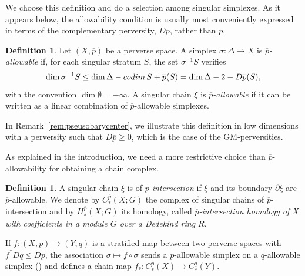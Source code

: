 \documentclass[a4paper,10pt,english,reqno]{amsart}
\theoremstyle{plain}
\theoremstyle{definition}
\newtheorem{definition}[proposition]{Definition}
\theoremstyle{remark}
\numberwithin{equation}{section}
\newcommand{\remref}[1]{Remark~\ref{#1}}
\def\ov{\overline}
\def\codim{{\rm codim\,}}
\renewcommand\1{\hbox{\ding{192}}}
\renewcommand\2{\hbox{\ding{193}}}
\newcommand\3{\hbox{\ding{194}}}
\newcommand\4{\hbox{\ding{195}}}
\begin{document}
%
We choose this  definition and do   a selection among singular simplexes. 
%
As it appears below, the allowability condition is usually most conveniently expressed in terms of the
complementary perversity, $D\ov{p}$, rather than $\ov{p}$.
%

\begin{definition}\label{def:homotopygeom}
Let $(X,\ov{p})$  be a  perverse space.
A simplex $\sigma\colon \Delta\to X$ is  
\emph{$\ov{p}$-allowable}  
if, for each singular stratum $S$, the set $\sigma^{-1}S$ verifies
%
\begin{equation}\label{equa:admissibleST}
\dim \sigma^{-1}S\leq \dim\Delta-\codim S +\ov{p}(S)=\dim\Delta-2-D\ov{p}(S),
\end{equation}
with the convention $\dim\emptyset=-\infty$.
A singular  chain $\xi$ is \emph{$\ov{p}$-allowable} if it can be written as a linear combination of 
$\ov{p}$-allowable  simplexes.
\end{definition}

%
 In \remref{rem:pseusobarycenter}, we illustrate this definition  in low dimensions with a  perversity such that 
 $D\ov{p}\geq 0$, which is the case of the GM-perversities.
%
%

\medskip
As explained in the introduction, we need a more restrictive choice than $\ov{p}$-allowability 
for obtaining a chain complex.
 
\begin{definition}\label{def:intersectionhomology}
A singular  chain $\xi$ is  of \emph{$\ov{p}$-intersection} if $\xi$ and its boundary $\partial \xi$ are $\ov{p}$-allowable.
We denote by $C_{*}^{\ov{p}}(X;G)$ the complex of singular chains of $\ov{p}$-intersection
and by $H_*^{\ov{p}}(X;G)$ its homology, called
\emph{$\ov{p}$-intersection homology of $X$ with coefficients in a module $G$ over a Dedekind ring $R$}.
\end{definition}


If $f\colon (X,\ov{p})\to (Y,\ov{q})$ is  a stratified map between two perverse  spaces 
with  $f^*D\ov q \leq D\ov p$,   the association $\sigma\mapsto f\circ \sigma$ sends 
a $\ov{p}$-allowable simplex on a $\ov{q}$-allowable simplex
(\cite[Proposition 1]{CST8}) and defines a chain map
$f_{*}\colon C_*^{\ov p} (X)\to C_*^{\ov q} (Y)$.
\end{document}
